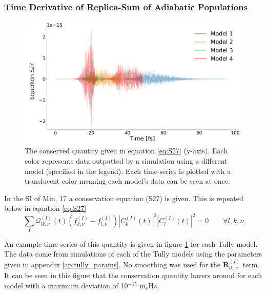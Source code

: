 \subsubsection{Time Derivative of Replica-Sum of Adiabatic Populations}
\begin{figure}[ht]
	\includegraphics[width=\textwidth]{../img/CTMQC/TullyModels/CTMQC_S27.png}
	\caption{\label{fig:S27}The conserved quantity given in equation \eqref{eq:S27} (y-axis). Each color represents data outputted by a simulation using a different model (specified in the legend). Each time-series is plotted with a translucent color meaning each model's data can be seen at once.}
\end{figure}

\noindent In the SI of Min, 17 \cite{min_ab_2017} a conservation equation (S27) is given. This is repeated below in equation \eqref{eq:S27}
\begin{equation}
	\sum_{I} \mathcal{Q}_{lk, \nu}^{(I)}(t) \left( f_{k, \nu}^{(I)} - f_{l, \nu}^{(I)} \right) |C_{k}^{(I)} (t)|^2 |C_{l}^{(I)} (t)|^2 = 0  \qquad \forall l, k, \nu
	\label{eq:S27}
\end{equation}

An example time-series of this quantity is given in figure \ref{fig:S27} for each Tully model. The data  come from simulations of each of the Tully models using the parameters given in appendix \ref{ap:tully_params}. No smoothing was used for the $\mathbf{R}_{lk, \nu}^{(I)}$ term. It can be seen in this figure that the conservation quantity hovers around  for each model with a maximum deviation of 10$^{-15}$ m$_{e}$Ha.

